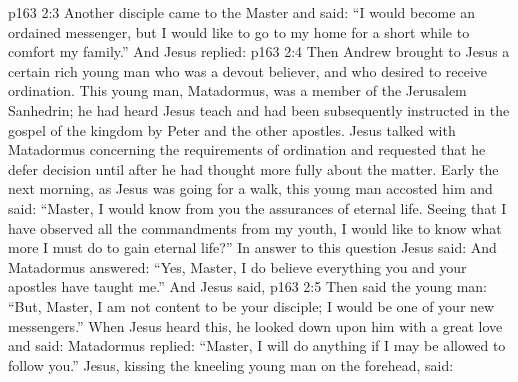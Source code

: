 \vs p163 2:3 Another disciple came to the Master and said: “I would become an ordained messenger, but I would like to go to my home for a short while to comfort my family.” And Jesus replied: 
\vs p163 2:4 \pc Then Andrew brought to Jesus a certain rich young man who was a devout believer, and who desired to receive ordination. This young man, Matadormus, was a member of the Jerusalem Sanhedrin; he had heard Jesus teach and had been subsequently instructed in the gospel of the kingdom by Peter and the other apostles. Jesus talked with Matadormus concerning the requirements of ordination and requested that he defer decision until after he had thought more fully about the matter. Early the next morning, as Jesus was going for a walk, this young man accosted him and said: “Master, I would know from you the assurances of eternal life. Seeing that I have observed all the commandments from my youth, I would like to know what more I must do to gain eternal life?” In answer to this question Jesus said:  And Matadormus answered: “Yes, Master, I do believe everything you and your apostles have taught me.” And Jesus said, 
\vs p163 2:5 Then said the young man: “But, Master, I am not content to be your disciple; I would be one of your new messengers.” When Jesus heard this, he looked down upon him with a great love and said:  Matadormus replied: “Master, I will do anything if I may be allowed to follow you.” Jesus, kissing the kneeling young man on the forehead, said: 
